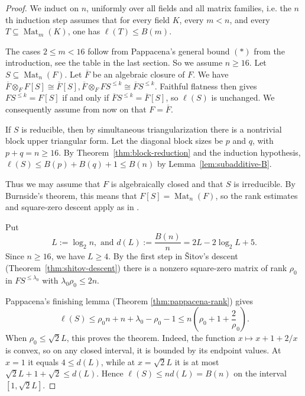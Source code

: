 \documentclass[11pt]{article}
\renewcommand{\geq}{\geqslant}
\renewcommand{\leq}{\leqslant}
\newcommand{\Mat}{\operatorname{Mat}}
\newtheorem{auxiliary proposition}[theorem]{Auxiliary Proposition}
\newtheorem{main conjecture}[theorem]{Main Conjecture}
\newtheorem{main theorem}[theorem]{Main Theorem}
\newtheorem{modesty proposition}[theorem]{Modesty Proposition}
\newtheorem{open problem}[theorem]{Open Problem}
\newtheorem{convergence lemma}[theorem]{Convergence Lemma}
\newtheorem{corrected lemma}[theorem]{Corrected Lemma}
\newtheorem{growth lemma}[theorem]{Growth Lemma}
\newtheorem{coefficient lemma}[theorem]{Integrality Lemma}
\newtheorem{interpolation lemma}[theorem]{Interpolation Lemma}
\newtheorem{kernel lemma}[theorem]{Kernel Lemma}
\newtheorem{limit lemma}[theorem]{Limit Lemma}
\newtheorem{tandem lemma}[theorem]{Modesty Lemma}
\newtheorem{zero-finding lemma}[theorem]{Zero-Finding Lemma}
\numberwithin{equation}{section}
\begin{document}
\begin{proof}

We induct on $n$, uniformly
over all fields and all matrix families, i.e. the $n$th induction step assumes that for every field $K$, every $m<n$, and every
$T\subseteq\Mat_m(K)$, one has $\ell(T)\leq B(m)$. 

The cases $2\leq m<16$ follow from Pappacena's general bound $(*)$ from the introduction, see the table in the last section. So we assume $n\geq 16$. Let $S\subseteq \Mat_n(F)$. Let $\overline F$ be an algebraic
closure of $F$. We have $ \overline F\otimes_F F[S]\cong\overline F[S], \overline F\otimes_F FS^{\leq k}\cong\overline F S^{\leq k}.$
Faithful flatness then gives $FS^{\leq k}=F[S]$ if and only if $\overline F S^{\leq k}=\overline F[S]$, so
$\ell(S)$ is unchanged.  We consequently assume from now on that $F=\overline{F}$.

If $S$ is reducible, then by simultaneous triangularization there is a nontrivial block upper triangular form.  Let the diagonal block sizes be $p$ and $q$, with $p+q=n\geq 16$.  By Theorem~\ref{thm:block-reduction} and the induction hypothesis, $\ell(S) \leq B(p)+B(q)+1  \leq B(n)$ by Lemma~\ref{lem:subadditive-B}. 

 Thus we may assume that $F$ is algebraically closed and that $S$ is irreducible.  By Burnside's theorem, this means that $F[S]=\Mat_n(F)$, so the rank estimates and square-zero descent apply as in \cite{Shitov2019}. %

Put $$L:=\log_2 n, \text{ and } d(L):=\frac{B(n)}{n}=2L-2\log_2L+5.$$
Since $n\geq 16$, we have $L\geq 4$.  By the first step  in \v{S}itov's descent (Theorem~\ref{thm:shitov-descent}) there is a nonzero square-zero matrix of rank $\rho_0$ in $F S^{\leq \lambda_0}$ with $\lambda_0\rho_0\leq 2n.$

Pappacena's finishing lemma (Theorem \ref{thm:pappacena-rank}) gives
$$\ell(S)\leq \rho_0n+n+\lambda_0-\rho_0-1\leq n\left(\rho_0+1+\frac2\rho_0\right).
$$ When $\rho_0\leq \sqrt2 L$, this proves the theorem. Indeed, the function $x\mapsto x+1+2/x$ is convex, so on any closed interval,  it is
bounded by its endpoint values.  At $x=1$ it equals $4\leq d(L)$,
while at $x=\sqrt2 L$ it is at most
$\sqrt2 L+1+\sqrt2\leq d(L)$. Hence $\ell(S)\leq nd(L)=B(n)$ on the interval $[1,\sqrt2 L]$.


\end{proof}
\end{document}
